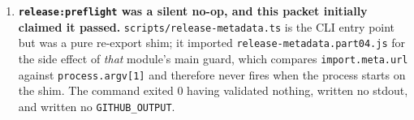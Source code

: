 \begin{enumerate}
  \textbf{A prerelease version string overflows the DOGFOOD release nav.} At 120x40, \texttt{W\allowbreak{}h\allowbreak{}a\allowbreak{}t\allowbreak{}'\allowbreak{}s\allowbreak{} \allowbreak{}N\allowbreak{}e\allowbreak{}w\allowbreak{} \allowbreak{}i\allowbreak{}n\allowbreak{} \allowbreak{}v\allowbreak{}8\allowbreak{}.\allowbreak{}0\allowbreak{}.\allowbreak{}0\allowbreak{}-\allowbreak{}r\allowbreak{}c\allowbreak{}.\allowbreak{}1} rendered as \texttt{W\allowbreak{}h\allowbreak{}a\allowbreak{}t\allowbreak{}'\allowbreak{}s\allowbreak{} \allowbreak{}N\allowbreak{}e\allowbreak{}w\allowbreak{} \allowbreak{}i\allowbreak{}n\allowbreak{} \allowbreak{}v\allowbreak{}8\allowbreak{}.\allowbreak{}0\allowbreak{}.\allowbreak{}0\allowbreak{}-\allowbreak{}r\allowbreak{}c\allowbreak{}.}. Release guide titles and ids now key off the line, which is also what they describe.
\item
  \textbf{\texttt{r\allowbreak{}e\allowbreak{}l\allowbreak{}e\allowbreak{}a\allowbreak{}s\allowbreak{}e\allowbreak{}:\allowbreak{}p\allowbreak{}r\allowbreak{}e\allowbreak{}f\allowbreak{}l\allowbreak{}i\allowbreak{}g\allowbreak{}h\allowbreak{}t} was a silent no-op, and this packet initially claimed it passed.} \texttt{s\allowbreak{}c\allowbreak{}r\allowbreak{}i\allowbreak{}p\allowbreak{}t\allowbreak{}s\allowbreak{}/\allowbreak{}r\allowbreak{}e\allowbreak{}l\allowbreak{}e\allowbreak{}a\allowbreak{}s\allowbreak{}e\allowbreak{}-\allowbreak{}m\allowbreak{}e\allowbreak{}t\allowbreak{}a\allowbreak{}d\allowbreak{}a\allowbreak{}t\allowbreak{}a\allowbreak{}.\allowbreak{}t\allowbreak{}s} is the CLI entry point but was a pure re-export shim; it imported \texttt{r\allowbreak{}e\allowbreak{}l\allowbreak{}e\allowbreak{}a\allowbreak{}s\allowbreak{}e\allowbreak{}-\allowbreak{}m\allowbreak{}e\allowbreak{}t\allowbreak{}a\allowbreak{}d\allowbreak{}a\allowbreak{}t\allowbreak{}a\allowbreak{}.\allowbreak{}p\allowbreak{}a\allowbreak{}r\allowbreak{}t\allowbreak{}0\allowbreak{}4\allowbreak{}.\allowbreak{}j\allowbreak{}s} for the side effect of \emph{that} module's main guard, which compares \texttt{i\allowbreak{}m\allowbreak{}p\allowbreak{}o\allowbreak{}r\allowbreak{}t\allowbreak{}.\allowbreak{}m\allowbreak{}e\allowbreak{}t\allowbreak{}a\allowbreak{}.\allowbreak{}u\allowbreak{}r\allowbreak{}l} against \texttt{p\allowbreak{}r\allowbreak{}o\allowbreak{}c\allowbreak{}e\allowbreak{}s\allowbreak{}s\allowbreak{}.\allowbreak{}a\allowbreak{}r\allowbreak{}g\allowbreak{}v\allowbreak{}[\allowbreak{}1\allowbreak{}]} and therefore never fires when the process starts on the shim. The command exited 0 having validated nothing, written no stdout, and written no \texttt{G\allowbreak{}I\allowbreak{}T\allowbreak{}H\allowbreak{}U\allowbreak{}B\allowbreak{}\_\allowbreak{}O\allowbreak{}U\allowbreak{}T\allowbreak{}P\allowbreak{}U\allowbreak{}T}.


\end{enumerate}
